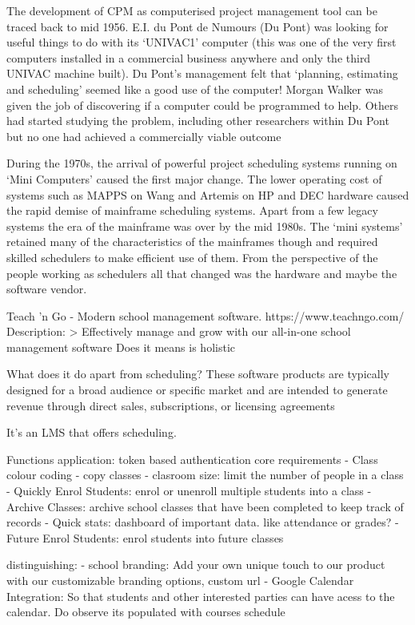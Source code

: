 The development of CPM as computerised project management tool can be traced back to mid 1956. E.I. du Pont de Numours (Du Pont) was looking for useful things to do with its ‘UNIVAC1’ computer (this was one of the very first computers installed in a commercial business anywhere and only the third UNIVAC machine built).
Du Pont’s management felt that ‘planning, estimating and scheduling’ seemed like a good use of the computer! Morgan Walker was given the job of discovering if a computer could be programmed to help. Others had started studying the problem, including other researchers within
Du Pont but no one had achieved a commercially viable outcome

During the 1970s, the arrival of powerful project scheduling systems running on ‘Mini Computers’ caused the first major change. The lower operating cost of systems such as MAPPS on Wang and Artemis on HP and DEC hardware caused the rapid demise of mainframe scheduling systems. Apart from a few legacy systems the era of the mainframe was over by the
mid 1980s. The ‘mini systems’ retained many of the characteristics of the mainframes though and
required skilled schedulers to make efficient use of them. From the perspective of the people
working as schedulers all that changed was the hardware and maybe the software vendor.

Teach 'n Go - Modern school management software. https://www.teachngo.com/
Description: 
> Effectively manage and grow with our all-in-one school management software
Does it means is holistic

What does it do apart from scheduling?
These software products are typically designed for a broad audience or specific market and are intended to generate revenue through direct sales, subscriptions, or licensing agreements

It's an LMS that offers scheduling.

Functions
    application: token based authentication
        core requirements
            - Class colour coding
            - copy classes
            - clasroom size: limit the number of people in a class
            - Quickly Enrol Students: enrol or unenroll multiple students into a class
            - Archive Classes: archive school classes that have been completed to keep track of records
            - Quick stats: dashboard of important data. like attendance or grades?
            - Future Enrol Students: enrol students into future classes

        distinguishing:
            - school branding: Add your own unique touch to our product with our customizable branding options, custom url
            - Google Calendar Integration: So that students and other interested parties can have acess to the calendar. Do observe its populated with courses schedule


